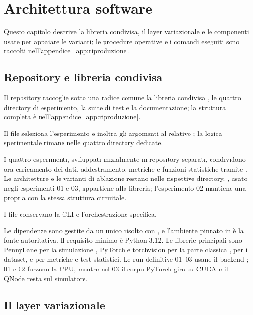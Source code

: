 \chapter{Architettura software}
\label{cap:software}

Questo capitolo descrive la libreria condivisa, il layer variazionale e le
componenti usate per appaiare le varianti; le procedure operative e i comandi
eseguiti sono raccolti nell'appendice~\ref{app:riproduzione}.

\section{Repository e libreria condivisa}
\label{sec:repository}

Il repository raccoglie sotto una radice comune la libreria condivisa
, le quattro directory di esperimento, la suite di test e
la documentazione; la struttura completa è nell'appendice~\ref{app:riproduzione}.

Il file  seleziona l'esperimento e inoltra gli argomenti al relativo
; la logica sperimentale rimane nelle quattro directory dedicate.

I quattro esperimenti, sviluppati inizialmente in repository separati, condividono
ora caricamento dei dati, addestramento, metriche e funzioni statistiche tramite
. Le architetture e le varianti di ablazione restano
nelle rispettive directory. , usato negli esperimenti 01 e
03, appartiene alla libreria; l'esperimento 02 mantiene una propria
 con la stessa struttura circuitale.

I file  conservano la CLI e l'orchestrazione specifica.

Le dipendenze sono gestite da un unico  risolto con
, e l'ambiente pinnato in  è la fonte autoritativa. Il
requisito minimo è Python 3.12. Le librerie principali sono PennyLane per la
simulazione \parencite{bergholm2018pennylane}, PyTorch e torchvision per la parte
classica \parencite{paszke2019pytorch},  per i dataset,
 e  per metriche e test statistici. Le run
definitive 01--03 usano il backend ; 01 e 02 forzano la CPU,
mentre nel 03 il corpo PyTorch gira su CUDA e il QNode resta sul simulatore.

\section{Il layer variazionale}
\label{sec:quantum-linear}


